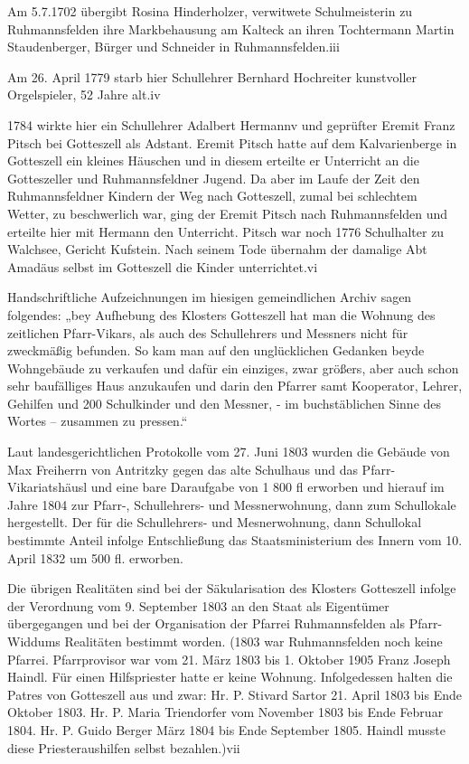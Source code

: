 \documentclass[12pt,a4paper]{book}
\begin{document}
Am 5.7.1702 übergibt Rosina Hinderholzer, verwitwete Schulmeisterin zu
Ruhmannsfelden ihre Markbehausung am Kalteck an ihren Tochtermann Martin
Staudenberger, Bürger und Schneider in Ruhmannsfelden.iii

Am 26. April 1779 starb hier Schullehrer Bernhard Hochreiter kunstvoller
Orgelspieler, 52 Jahre alt.iv

1784 wirkte hier ein Schullehrer Adalbert Hermannv und geprüfter Eremit Franz
Pitsch bei Gotteszell als Adstant. Eremit Pitsch hatte auf dem Kalvarienberge in
Gotteszell ein kleines Häuschen und in diesem erteilte er Unterricht an die
Gotteszeller und Ruhmannsfeldner Jugend. Da aber im Laufe der Zeit den
Ruhmannsfeldner Kindern der Weg nach Gotteszell, zumal bei schlechtem Wetter, zu
beschwerlich war, ging der Eremit Pitsch nach Ruhmannsfelden und erteilte hier
mit Hermann den Unterricht. Pitsch war noch 1776 Schulhalter zu Walchsee,
Gericht Kufstein. Nach seinem Tode übernahm der damalige Abt Amadäus selbst im
Gotteszell die Kinder unterrichtet.vi

Handschriftliche Aufzeichnungen im hiesigen gemeindlichen Archiv sagen
folgendes: „bey Aufhebung des Klosters Gotteszell hat man die Wohnung des
zeitlichen Pfarr-Vikars, als auch des Schullehrers und Messners nicht für
zweckmäßig befunden. So kam man auf den unglücklichen Gedanken beyde Wohngebäude
zu verkaufen und dafür ein einziges, zwar größers, aber auch schon sehr
baufälliges Haus anzukaufen und darin den Pfarrer samt Kooperator, Lehrer,
Gehilfen und 200 Schulkinder und den Messner, - im buchstäblichen Sinne des
Wortes – zusammen zu pressen.“

Laut landesgerichtlichen Protokolle vom 27. Juni 1803 wurden die Gebäude von Max
Freiherrn von Antritzky gegen das alte Schulhaus und das Pfarr-Vikariatshäusl
und eine bare Daraufgabe von 1 800 fl erworben und hierauf im Jahre 1804 zur
Pfarr-, Schullehrers- und Messnerwohnung, dann zum Schullokale hergestellt. Der
für die Schullehrers- und Mesnerwohnung, dann Schullokal bestimmte Anteil
infolge Entschließung das Staatsministerium des Innern vom 10. April 1832 um 500
fl. erworben.

Die übrigen Realitäten sind bei der Säkularisation des Klosters Gotteszell
infolge der Verordnung vom 9. September 1803 an den Staat als Eigentümer
übergegangen und bei der Organisation der Pfarrei Ruhmannsfelden als
Pfarr-Widdums Realitäten bestimmt worden. (1803 war Ruhmannsfelden noch keine
Pfarrei. Pfarrprovisor war vom 21. März 1803 bis 1. Oktober 1905 Franz Joseph
Haindl. Für einen Hilfspriester hatte er keine Wohnung. Infolgedessen halten die
Patres von Gotteszell aus und zwar: Hr. P. Stivard Sartor 21. April 1803 bis
Ende Oktober 1803. Hr. P. Maria Triendorfer vom November 1803 bis Ende Februar
1804. Hr. P. Guido Berger März 1804 bis Ende September 1805. Haindl musste diese
Priesteraushilfen selbst bezahlen.)vii
\end{document}

